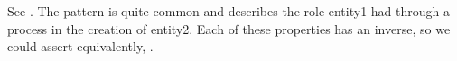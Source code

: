 \documentclass[letterpaper,10pt,english]{sphinxmanual}
\begin{document}
\begin{sphinxVerbatim}[commandchars=\\\{\}]
  
  
  
\end{sphinxVerbatim}

\sphinxAtStartPar
See {\hyperref[\detokenize{object-properties:table-16}]{}}. The pattern  is quite common and describes the role entity1 had through a process
in
the creation of entity2. Each of these properties has an inverse, so we could assert
equivalently, .
\end{document}
